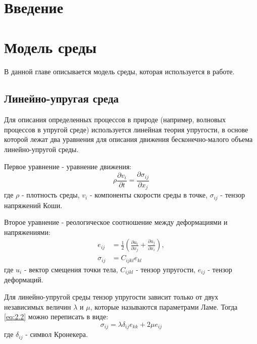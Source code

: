 \documentclass[12pt,a4paper, titlepage, openany]{book}
\begin{document}
\tableofcontents

\chapter{Введение}


\chapter{Модель среды}
В данной главе описывается модель среды, которая используется в работе.



\section{Линейно-упругая среда}
\par
Для описания определенных процессов в природе (например, волновых процессов в упругой среде) используется линейная теория упругости, в основе которой лежат два уравнения для описания движения бесконечно-малого объема линейно-упругой среды.
\par
Первое уравнение - уравнение движения:
\begin{equation}
\rho \frac{\partial v_i}{\partial t} = \frac{\partial \sigma_{ij}}{\partial x_j}
\end{equation}
где $\rho$ - плотность среды, $v_i$ - компоненты скорости среды в точке, $\sigma_{ij}$ - тензор напряжений Коши.
\par
Второе уравнение - реологическое соотношение между деформациями и напряжениями:
\begin{equation}
\label{eq:2.2}
\begin{aligned}
e_{ij} &= \frac{1}{2}(\frac{\partial u_i}{\partial x_j} + \frac{\partial u_j}{\partial x_i}),\\
\sigma_{ij} &= C_{ijkl} e_{kl}
\end{aligned}
\end{equation}
где $u_i$ - вектор смещения точки тела, $C_{ijkl}$ - тензор упругости, $e_{ij}$ - тензор деформаций.
\par
Для линейно-упругой среды тензор упругости зависит только от двух независимых величин $\lambda$ и $\mu$, которые называются параметрами Ламе. Тогда \ref{eq:2.2} можно переписать в виде:
\begin{equation}
\label{eq:2.3}
\sigma_{ij} = \lambda \delta_{ij} e_{kk} + 2 \mu e_{ij}
\end{equation}
где $\delta_{ij}$ - символ Кронекера. 
\par
\end{document}
